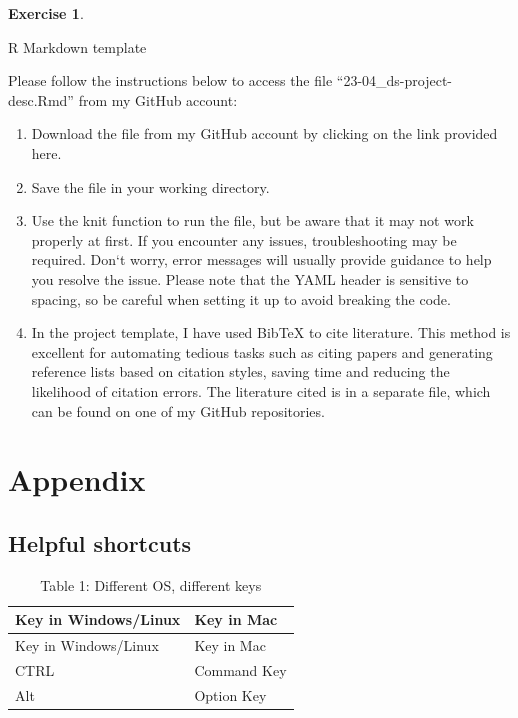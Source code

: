 \documentclass[
  12pt,
  oneside]{book}
\providecommand{\tightlist}{%
  \setlength{\itemsep}{0pt}\setlength{\parskip}{0pt}}
\theoremstyle{definition}
\theoremstyle{definition}
\theoremstyle{definition}
\newtheorem{exercise}{Exercise}[chapter]
\theoremstyle{definition}
\theoremstyle{remark}
\begin{document}
\begin{exercise}
\protect\hypertarget{exr:rmdsecond}{}\label{exr:rmdsecond}

R Markdown template

Please follow the instructions below to access the file ``23-04\_ds-project-desc.Rmd'' from my GitHub account:

\begin{enumerate}
\def\labelenumi{\arabic{enumi}.}
\tightlist
\item
  Download the file from my GitHub account by clicking on the link provided here.
\item
  Save the file in your working directory.
\item
  Use the knit function to run the file, but be aware that it may not work properly at first. If you encounter any issues, troubleshooting may be required. Don`t worry, error messages will usually provide guidance to help you resolve the issue. Please note that the YAML header is sensitive to spacing, so be careful when setting it up to avoid breaking the code.
\item
  In the project template, I have used BibTeX to cite literature. This method is excellent for automating tedious tasks such as citing papers and generating reference lists based on citation styles, saving time and reducing the likelihood of citation errors. The literature cited is in a separate file, which can be found on one of my GitHub repositories.
\end{enumerate}

\end{exercise}

\hypertarget{appendix}{%
\chapter{Appendix}\label{appendix}}

\hypertarget{helpful-shortcuts}{%
\section{Helpful shortcuts}\label{helpful-shortcuts}}

\begin{longtable}[]{@{}ll@{}}
\caption{Table 1: Different OS, different keys}\tabularnewline
\toprule()
Key in Windows/Linux & Key in Mac \\
\midrule()
\endfirsthead
\toprule()
Key in Windows/Linux & Key in Mac \\
\midrule()
\endhead
CTRL & Command Key \\
Alt & Option Key \\
\bottomrule()
\end{longtable}
\end{document}
